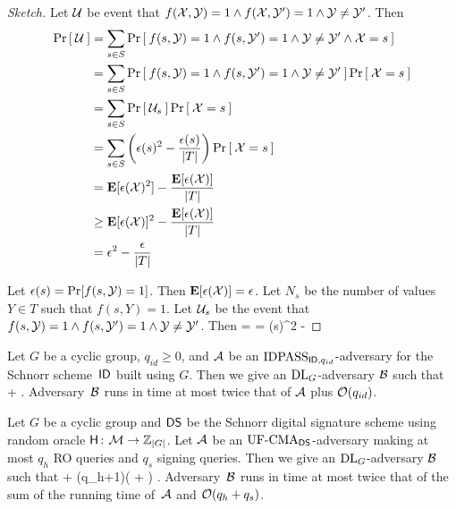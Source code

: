 \begin{proof}[Sketch]
Let ${\cal U}$ be event that $f({\cal X},{\cal Y}) = 1 \land f({\cal X},{\cal Y}') = 1 \land
{\cal Y} \ne {\cal Y}'$. Then 
\begin{align*}
  \Pr\left[\: {\cal U} \:\right] 
  & = \sum_{s \in S} \Pr\left[\: f(s,{\cal Y}) = 1 \land f(s,{\cal Y}') = 1 \land {\cal Y} \ne {\cal Y}' \land {\cal X} = s \:\right]\\
  & = \sum_{s \in S} \Pr\left[\: f(s,{\cal Y}) = 1 \land f(s,{\cal Y}') = 1 \land {\cal Y} \ne {\cal Y}' \:\right]\Pr\left[\: {\cal X} = s \:\right]\\
  & = \sum_{s \in S} \Pr\left[\: {\cal U}_s \:\right] \Pr\left[\: {\cal X} = s \:\right]\\
  & = \sum_{s \in S} \left(\epsilon(s)^2 - \frac{\epsilon(s)}{|T|}\right) \Pr\left[\: {\cal X} = s \:\right]\\
  & = {\textbf E}[\epsilon({\cal X})^2] - \frac{{\textbf E}[\epsilon({\cal X})]}{|T|}\\
  & \ge {\textbf E}[\epsilon({\cal X})]^2 - \frac{{\textbf E}[\epsilon({\cal X})]}{|T|}\\
  & = \epsilon^2 - \frac{\epsilon}{|T|}
\end{align*}

Let $\epsilon(s) = \Pr[f(s,{\cal Y}) = 1]$. 
Then ${\textbf E}[\epsilon({\cal X})] = \epsilon$. Let $N_s$ be the number of values
$Y \in T$ such that $f(s,Y) = 1$. Let ${\cal U}_s$ be the event that $f(s,{\cal Y}) =
1 \land f(s,{\cal Y}') = 1 \land {\cal Y} \ne {\cal Y}'$. Then
\bnm
   =  = \epsilon(s)^2 -  
\enm
\end{proof}




\begin{theorem*}
Let $G$ be a cyclic group, $q_{id} \ge 0$, 
and ${\mathcal A}$ be an $\textnormal{IDPASS}_{\textsf{ID},q_{id}}$-adversary for the Schnorr
scheme~$\textsf{ID}$
built using $G$. Then we give an $\textnormal{DL}_G$-adversary ${\mathcal B}$ such that
\bnm
   \le {} +  \;.
\enm
Adversary~${\mathcal B}$ runs in time at most twice that of ${\mathcal A}$ plus
${\cal O}(q_{id})$.
\end{theorem*}


\begin{theorem*}
Let $G$ be a cyclic group and ${\mathsf{DS}}$ be the Schnorr digital signature scheme
using random oracle $\mathsf{H} {{\kern .05em}\colon{\kern .05em}}{\cal M}\rightarrow{{\mathbb Z}}_{|G|}$.  
Let ${\mathcal A}$ be an $\textnormal{UF-CMA}_{{\mathsf{DS}}}$-adversary making at most $q_h$ RO queries and
$q_s$ signing queries.
Then we give an $\textnormal{DL}_G$-adversary ${\mathcal B}$ such that
\bnm
  \AdvUFCMA{\DS}{\advA} \le {} + (q_h+1)\left( + \right) \;.
\enm
Adversary~${\mathcal B}$ runs in time at most twice that of the sum of the running time
of~${\mathcal A}$ and ${\cal O}(q_h+q_s)$.
\end{theorem*}
